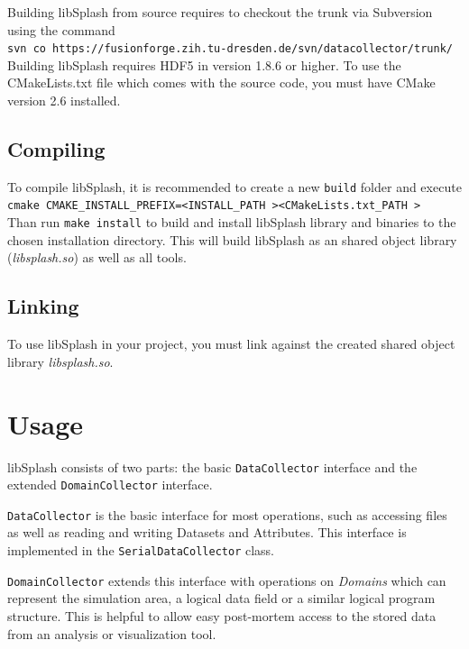 \documentclass[a4paper,10pt,BCOR12mm]{report}
\newcommand{\command}[1]{\small \texttt{#1}}
\begin{document}
Building libSplash from source requires to checkout the trunk via Subversion using the command\\
\command{svn co https://fusionforge.zih.tu-dresden.de/svn/datacollector/trunk/}
Building libSplash requires HDF5 in version 1.8.6 or higher.
To use the CMakeLists.txt file which comes with the source code,
you must have CMake version 2.6 installed.

\subsection{Compiling}

To compile libSplash, it is recommended to create a new \command{build} folder
and execute \command{cmake CMAKE\_INSTALL\_PREFIX=\textless INSTALL\_PATH \textgreater \textless CMakeLists.txt\_PATH \textgreater}\\
Than run \command{make install} to build and install libSplash library and binaries to the chosen installation directory.
This will build libSplash as an shared object library (\emph{libsplash.so}) as well as all tools.

\subsection{Linking}

To use libSplash in your project, you must link against the created shared object library
\emph{libsplash.so}.


\section{Usage}

libSplash consists of two parts: the basic \texttt{DataCollector} interface and the extended \texttt{DomainCollector} interface.

\texttt{DataCollector} is the basic interface for most operations, such as accessing files as well as reading and writing Datasets and Attributes.
This interface is implemented in the \texttt{SerialDataCollector} class.

\texttt{DomainCollector} extends this interface with operations on \emph{Domains} which can represent the simulation area,
a logical data field or a similar logical program structure. This is helpful to allow easy post-mortem access to the stored data from
an analysis or visualization tool.

\end{document}
